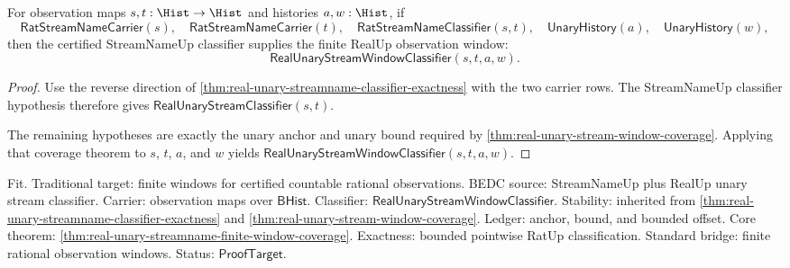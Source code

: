 \begin{theorem}
\label{thm:real-unary-streamname-finite-window-coverage}
For observation maps $s,t:\Hist\to\Hist$ and histories $a,w:\Hist$, if
$$
\mathsf{RatStreamNameCarrier}(s),\quad
\mathsf{RatStreamNameCarrier}(t),\quad
\mathsf{RatStreamNameClassifier}(s,t),\quad
\mathsf{UnaryHistory}(a),\quad
\mathsf{UnaryHistory}(w),
$$
then the certified StreamNameUp classifier supplies the finite RealUp
observation window:
$$
\mathsf{RealUnaryStreamWindowClassifier}(s,t,a,w).
$$
\end{theorem}
\begin{proof}
Use the reverse direction of
\autoref{thm:real-unary-streamname-classifier-exactness} with the two carrier
rows. The StreamNameUp classifier hypothesis therefore gives
$\mathsf{RealUnaryStreamClassifier}(s,t)$.

The remaining hypotheses are exactly the unary anchor and unary bound required
by \autoref{thm:real-unary-stream-window-coverage}. Applying that coverage
theorem to $s$, $t$, $a$, and $w$ yields
$\mathsf{RealUnaryStreamWindowClassifier}(s,t,a,w)$.
\end{proof}

Fit. Traditional target: finite windows for certified countable rational
observations. BEDC source: StreamNameUp plus RealUp unary stream classifier.
Carrier: observation maps over $\mathsf{BHist}$. Classifier:
$\mathsf{RealUnaryStreamWindowClassifier}$. Stability: inherited from
\autoref{thm:real-unary-streamname-classifier-exactness} and
\autoref{thm:real-unary-stream-window-coverage}. Ledger: anchor, bound, and
bounded offset. Core theorem:
\autoref{thm:real-unary-streamname-finite-window-coverage}. Exactness: bounded
pointwise RatUp classification. Standard bridge: finite rational observation
windows. Status: $\mathsf{ProofTarget}$.

